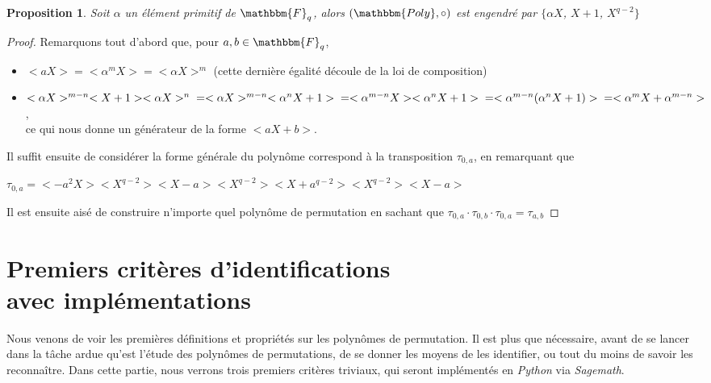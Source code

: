 \documentclass[12pt]{article}
\newcommand{\Fq}{\mathbbm{F}_q}
\newtheorem{prop}{Proposition}
\theoremstyle{definition}
\begin{document}
\begin{prop}
Soit $\alpha$ un élément primitif de $\Fq$, alors $(\mathbbm{Poly}, \circ)$ est engendré par $\{ \alpha X$, $X+1$, $X^{q-2}\}$
\end{prop}

\begin{proof}
Remarquons tout d'abord que, pour $a, b \in \Fq$, 
	\begin{itemize}
		\item $<aX> = <\alpha^mX> = <\alpha X>^m$ (cette dernière égalité découle de la loi de composition)
		\item $<\alpha X>^{m-n}<X+1><\alpha X>^n \newline
		= <\alpha X>^{m-n}<\alpha^nX + 1> \newline
		= <\alpha^{m-n} X ><\alpha^n X+ 1> \newline
		= <\alpha^{m-n}(\alpha^n X+ 1)> \newline
		= <\alpha^mX+\alpha^{m-n}>$,\\
ce qui nous donne un générateur de la forme $<aX + b>$.
	\end{itemize}
Il suffit ensuite de considérer la forme générale du polynôme correspond à la transposition $\tau_{0,a}$, en remarquant que 
\begin{center} $\tau_{0,a} = <-a^2X><X^{q-2}><X-a><X^{q-2}><X+a^{q-2}><X^{q-2}><X-a>$ \end{center}
Il est ensuite aisé de construire n'importe quel polynôme de permutation en sachant que $\tau_{0,a} \cdot \tau_{0,b} \cdot \tau_{0,a} = \tau_{a,b}$
\end{proof}


\pagebreak

\section{Premiers critères d'identifications\\avec implémentations}
Nous venons de voir les premières définitions et propriétés sur les polynômes de permutation. Il est plus que nécessaire, avant de se lancer dans la tâche ardue qu'est l'étude des polynômes de permutations, de se donner les moyens de les identifier, ou tout du moins de savoir les reconnaître. 
Dans cette partie, nous verrons trois premiers critères triviaux, qui seront implémentés en \textit{Python} via \textit{Sagemath}.
\end{document}
